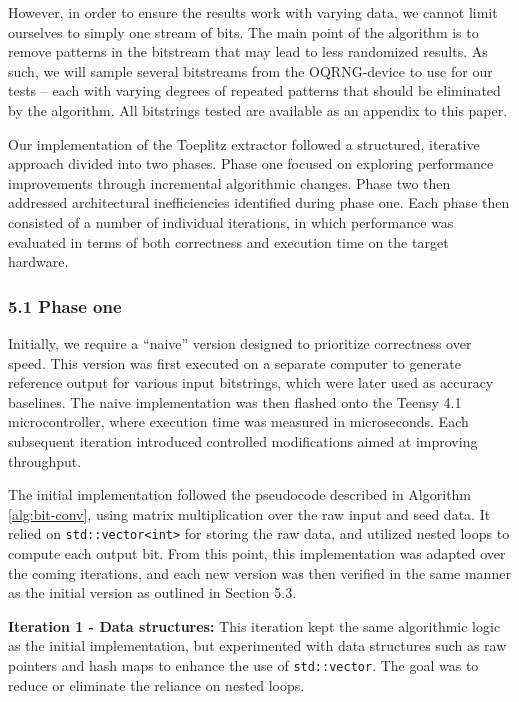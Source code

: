 \documentclass{sigchi}
\begin{document}
However, in order to ensure the results work with varying data, we cannot limit ourselves to simply one stream of bits. The main point of the algorithm is to remove patterns in the bitstream that may lead to less randomized results. As such, we will sample several bitstreams from the OQRNG-device to use for our tests -- each with varying degrees of repeated patterns that should be eliminated by the algorithm. All bitstrings tested are available as an appendix to this paper.

Our implementation of the Toeplitz extractor followed a structured, iterative approach divided into two phases. Phase one focused on exploring performance improvements through incremental algorithmic changes. Phase two then addressed architectural inefficiencies identified during phase one. Each phase then consisted of a number of individual iterations, in which performance was evaluated in terms of both correctness and execution time on the target hardware.

\subsubsection{5.1 Phase one}\label{phase-one}

Initially, we require a ``naive'' version designed to prioritize correctness over speed. This version was first executed on a separate computer to generate reference output for various input bitstrings, which were later used as accuracy baselines. The naive implementation was then flashed onto the Teensy 4.1 microcontroller, where execution time was measured in microseconds. Each subsequent iteration introduced controlled modifications aimed at improving throughput.

The initial implementation followed the pseudocode described in Algorithm \ref{alg:bit-conv}, using matrix multiplication over the raw input and seed data. It relied on \texttt{std::vector\textless{}int\textgreater{}} for storing the raw data, and utilized nested loops to compute each output bit. From this point, this implementation was adapted over the coming iterations, and each new version was then verified in the same manner as the initial version as outlined in Section 5.3.

\textbf{Iteration 1 - Data structures:} This iteration kept the same algorithmic logic as the initial implementation, but experimented with data structures such as raw pointers and hash maps to enhance the use of \texttt{std::vector}. The goal was to reduce or eliminate the reliance on nested loops.
\end{document}
